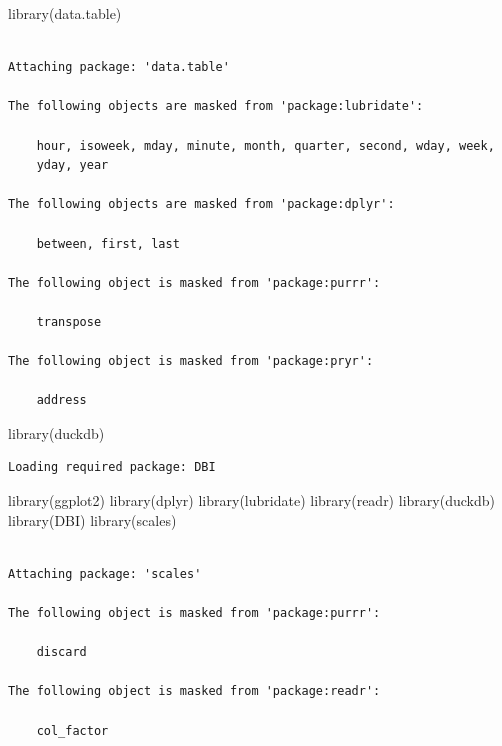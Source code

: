 \documentclass[
]{article}
\newenvironment{Shaded}{\begin{snugshade}}{\end{snugshade}}
\newcommand{\FunctionTok}[1]{\textcolor[rgb]{0.00,0.00,0.00}{#1}}
\newcommand{\NormalTok}[1]{\textcolor[rgb]{0.00,0.00,0.00}{#1}}
\begin{document}
\begin{Shaded}
\begin{Highlighting}[]
\FunctionTok{library}\NormalTok{(data.table)}
\end{Highlighting}
\end{Shaded}

\begin{verbatim}

Attaching package: 'data.table'

The following objects are masked from 'package:lubridate':

    hour, isoweek, mday, minute, month, quarter, second, wday, week,
    yday, year

The following objects are masked from 'package:dplyr':

    between, first, last

The following object is masked from 'package:purrr':

    transpose

The following object is masked from 'package:pryr':

    address
\end{verbatim}

\begin{Shaded}
\begin{Highlighting}[]
\FunctionTok{library}\NormalTok{(duckdb)}
\end{Highlighting}
\end{Shaded}

\begin{verbatim}
Loading required package: DBI
\end{verbatim}

\begin{Shaded}
\begin{Highlighting}[]
\FunctionTok{library}\NormalTok{(ggplot2)}
\FunctionTok{library}\NormalTok{(dplyr)}
\FunctionTok{library}\NormalTok{(lubridate)}
\FunctionTok{library}\NormalTok{(readr)}
\FunctionTok{library}\NormalTok{(duckdb)}
\FunctionTok{library}\NormalTok{(DBI)}
\FunctionTok{library}\NormalTok{(scales)}
\end{Highlighting}
\end{Shaded}

\begin{verbatim}

Attaching package: 'scales'

The following object is masked from 'package:purrr':

    discard

The following object is masked from 'package:readr':

    col_factor
\end{verbatim}
\end{document}

